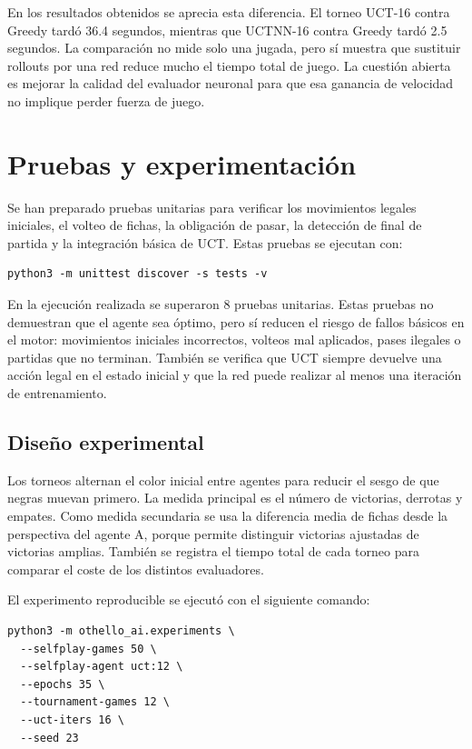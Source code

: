 \documentclass[conference,a4paper]{IEEEtran}
\begin{document}
En los resultados obtenidos se aprecia esta diferencia. El torneo UCT-16 contra
Greedy tardó 36.4 segundos, mientras que UCTNN-16 contra Greedy tardó 2.5
segundos. La comparación no mide solo una jugada, pero sí muestra que sustituir
rollouts por una red reduce mucho el tiempo total de juego. La cuestión abierta
es mejorar la calidad del evaluador neuronal para que esa ganancia de velocidad
no implique perder fuerza de juego.

\section{Pruebas y experimentación}

Se han preparado pruebas unitarias para verificar los movimientos legales
iniciales, el volteo de fichas, la obligación de pasar, la detección de final de
partida y la integración básica de UCT. Estas pruebas se ejecutan con:

\begin{verbatim}
python3 -m unittest discover -s tests -v
\end{verbatim}

En la ejecución realizada se superaron 8 pruebas unitarias. Estas pruebas no
demuestran que el agente sea óptimo, pero sí reducen el riesgo de fallos
básicos en el motor: movimientos iniciales incorrectos, volteos mal aplicados,
pases ilegales o partidas que no terminan. También se verifica que UCT siempre
devuelve una acción legal en el estado inicial y que la red puede realizar al
menos una iteración de entrenamiento.

\subsection{Diseño experimental}

Los torneos alternan el color inicial entre agentes para reducir el sesgo de que
negras muevan primero. La medida principal es el número de victorias, derrotas y
empates. Como medida secundaria se usa la diferencia media de fichas desde la
perspectiva del agente A, porque permite distinguir victorias ajustadas de
victorias amplias. También se registra el tiempo total de cada torneo para
comparar el coste de los distintos evaluadores.

El experimento reproducible se ejecutó con el siguiente comando:

\begin{verbatim}
python3 -m othello_ai.experiments \
  --selfplay-games 50 \
  --selfplay-agent uct:12 \
  --epochs 35 \
  --tournament-games 12 \
  --uct-iters 16 \
  --seed 23
\end{verbatim}
\end{document}
